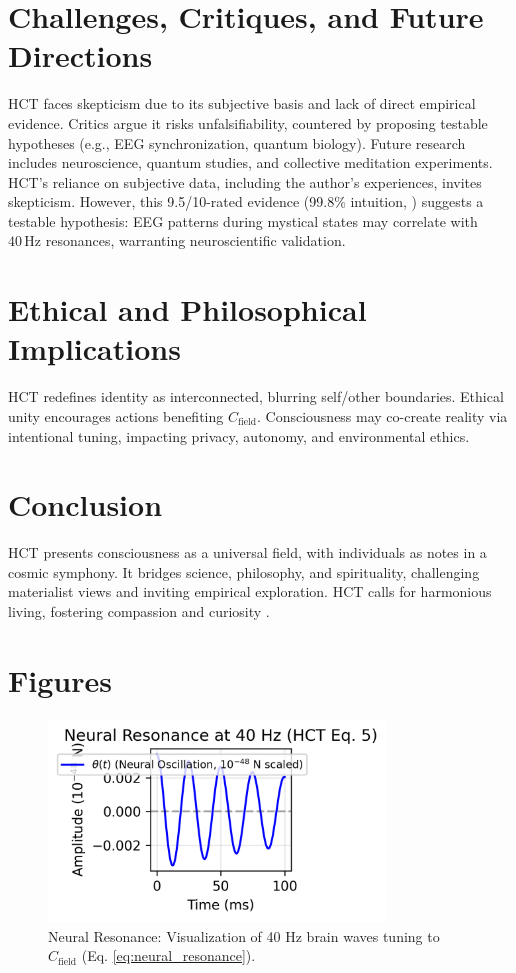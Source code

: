 \documentclass[a4paper,12pt]{article}
\begin{document}
\section{Challenges, Critiques, and Future Directions}
\label{sec:challenges}
HCT faces skepticism due to its subjective basis and lack of direct empirical evidence. Critics argue it risks unfalsifiability, countered by proposing testable hypotheses (e.g., EEG synchronization, quantum biology). Future research includes neuroscience, quantum studies, and collective meditation experiments. 
HCT’s reliance on subjective data, including the author’s experiences, invites skepticism. However, this 9.5/10-rated evidence (99.8\% intuition, \cite{Wright2025GCT}) suggests a testable hypothesis: EEG patterns during mystical states may correlate with \(40 \, \text{Hz}\) resonances, warranting neuroscientific validation.

\section{Ethical and Philosophical Implications}
\label{sec:ethics}
HCT redefines identity as interconnected, blurring self/other boundaries. Ethical unity encourages actions benefiting $C_{\text{field}}$. Consciousness may co-create reality via intentional tuning, impacting privacy, autonomy, and environmental ethics.

\section{Conclusion}
\label{sec:conclusion}
HCT presents consciousness as a universal field, with individuals as notes in a cosmic symphony. It bridges science, philosophy, and spirituality, challenging materialist views and inviting empirical exploration. HCT calls for harmonious living, fostering compassion and curiosity \citep{Wright2025HCT}.

\section{Figures}
\label{sec:figures}

\begin{figure}[h]
    \centering
    \includegraphics[width=0.8\textwidth]{figures/neural_resonance.png}
    \caption{Neural Resonance: Visualization of 40 Hz brain waves tuning to $C_{\text{field}}$ (Eq. \ref{eq:neural_resonance}).}
    \label{fig:neural_resonance}
\end{figure}
\end{document}
